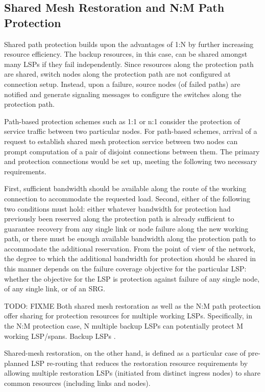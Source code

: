 \subsection{Shared Mesh Restoration and N:M Path Protection}

Shared path protection builds upon the advantages of 1:N by further
increasing resource efficiency. The backup resources, in this case,
can be shared amongst many LSPs if they fail independently. Since
resources along the protection path are shared, switch nodes along
the protection path are not configured at connection setup. Instead,
upon a failure, source nodes (of failed paths) are notified and generate
signaling messages to configure the switches along the protection
path.

Path-based protection schemes such as 1:1 or n:1 consider the protection
of service traffic between two particular nodes. For path-based schemes,
arrival of a request to establish shared mesh protection service between
two nodes can prompt computation of a pair of disjoint connections
between them. The primary and protection connections would be set
up, meeting the following two necessary requirements.

First, sufficient bandwidth should be available along the route of
the working connection to accommodate the requested load. Second,
either of the following two conditions must hold: either whatever
bandwidth for protection had previously been reserved along the protection
path is already sufficient to guarantee recovery from any single link
or node failure along the new working path, or there must be enough
available bandwidth along the protection path to accommodate the additional
reservation. From the point of view of the network, the degree to
which the additional bandwidth for protection should be shared in
this manner depends on the failure coverage objective for the particular
LSP: whether the objective for the LSP is protection against failure
of any single node, of any single link, or of an SRG.

TODO: FIXME Both shared mesh restoration as well as the N:M path protection
offer sharing for protection resources for multiple working LSPs.
Specifically, in the N:M protection case, N multiple backup LSPs can
potentially protect M working LSP/spans. Backup LSPs .

Shared-mesh restoration, on the other hand, is defined as a particular case of pre-planned LSP re-routing that reduces
the restoration resource requirements by allowing multiple restoration
LSPs (initiated from distinct ingress nodes) to share common resources
(including links and nodes).

